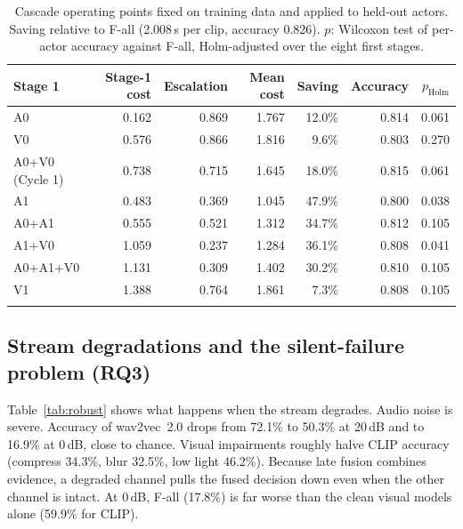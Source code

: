 \begin{table}[t]
\caption{Cascade operating points fixed on training data and applied to held-out actors. Saving relative to F-all (2.008\,s per clip, accuracy 0.826). $p$: Wilcoxon test of per-actor accuracy against F-all, Holm-adjusted over the eight first stages.}\label{tab:orders}
\centering\footnotesize
\begin{tabular}{@{}lrrrrrr@{}}
\toprule
Stage 1 & Stage-1 cost & Escalation & Mean cost & Saving & Accuracy & $p_\text{Holm}$ \\
\midrule
A0 & 0.162 & 0.869 & 1.767 & 12.0\% & 0.814 & 0.061 \\
V0 & 0.576 & 0.866 & 1.816 & 9.6\% & 0.803 & 0.270 \\
A0+V0 (Cycle 1) & 0.738 & 0.715 & 1.645 & 18.0\% & 0.815 & 0.061 \\
A1 & 0.483 & 0.369 & 1.045 & 47.9\% & 0.800 & 0.038 \\
A0+A1 & 0.555 & 0.521 & 1.312 & 34.7\% & 0.812 & 0.105 \\
A1+V0 & 1.059 & 0.237 & 1.284 & 36.1\% & 0.808 & 0.041 \\
A0+A1+V0 & 1.131 & 0.309 & 1.402 & 30.2\% & 0.810 & 0.105 \\
V1 & 1.388 & 0.764 & 1.861 & 7.3\% & 0.808 & 0.105 \\
\botrule
\end{tabular}
\end{table}

\subsection{Stream degradations and the silent-failure problem (RQ3)}

Table~\ref{tab:robust} shows what happens when the stream degrades. Audio noise is severe. Accuracy of wav2vec~2.0 drops from 72.1\% to 50.3\% at 20\,dB and to 16.9\% at 0\,dB, close to chance. Visual impairments roughly halve CLIP accuracy (compress 34.3\%, blur 32.5\%, low light 46.2\%). Because late fusion combines evidence, a degraded channel pulls the fused decision down even when the other channel is intact. At 0\,dB, F-all (17.8\%) is far worse than the clean visual models alone (59.9\% for CLIP).

